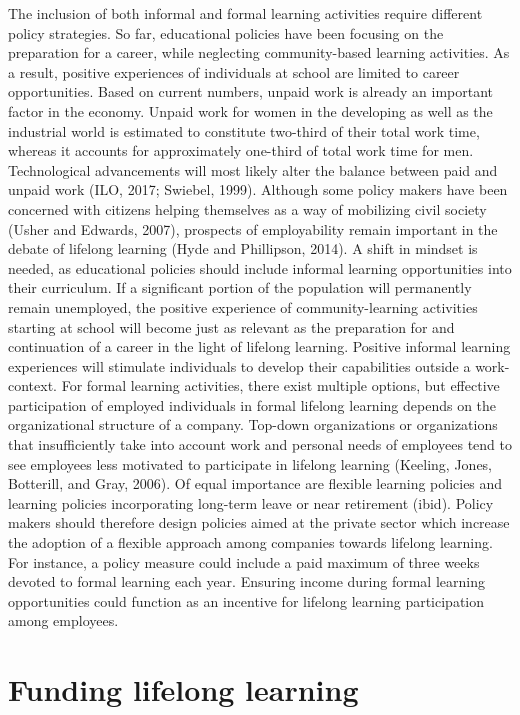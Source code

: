 The inclusion of both informal and formal learning activities require different policy strategies. So far, educational policies have been focusing on the preparation for a career, while neglecting community-based learning activities. As a result, positive experiences of individuals at school are limited to career opportunities. Based on current numbers, unpaid work is already an important factor in the economy. Unpaid work for women in the developing as well as the industrial world is estimated to constitute two-third of their total work time, whereas it accounts for approximately one-third of total work time for men. Technological advancements will most likely alter the balance between paid and unpaid work (ILO, 2017; Swiebel, 1999). Although some policy makers have been concerned with citizens helping themselves as a way of mobilizing civil society (Usher and Edwards, 2007), prospects of employability remain important in the debate of lifelong learning (Hyde and Phillipson, 2014). A shift in mindset is needed, as educational policies should include informal learning opportunities into their curriculum. If a significant portion of the population will permanently remain unemployed, the positive experience of community-learning activities starting at school will become just as relevant as the preparation for and continuation of a career in the light of lifelong learning. Positive informal learning experiences will stimulate individuals to develop their capabilities outside a work-context. 
For formal learning activities, there exist multiple options, but effective participation of employed individuals in formal lifelong learning depends on the organizational structure of a company. Top-down organizations or organizations that insufficiently take into account work and personal needs of employees tend to see employees less motivated to participate in lifelong learning (Keeling, Jones, Botterill, and Gray, 2006). Of equal importance are flexible learning policies and learning policies incorporating long-term leave or near retirement (ibid). Policy makers should therefore design policies aimed at the private sector which increase the adoption of a flexible approach among companies towards lifelong learning. For instance, a policy measure could include a paid maximum of three weeks devoted to formal learning each year. Ensuring income during formal learning opportunities could function as an incentive for lifelong learning participation among employees.

\section*{Funding lifelong learning}

